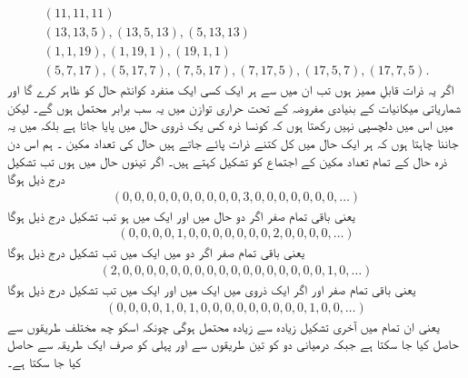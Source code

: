 \begin{align*}
	(11, 11, 11)\\
	(13, 13, 5), (13, 5, 13), (5, 13, 13)\\
	(1, 1, 19), (1, 19, 1), (19, 1, 1)\\
	(5, 7, 17), (5, 17, 7), (7, 5, 17), (7, 17, 5), (17, 5, 7), (17, 7, 5).
\end{align*}
اگر یہ ذرات قابلِ ممیز ہوں تب ان میں سے ہر ایک کسی ایک منفرد کوانٹم حال کو ظاہر کرے گا اور شماریاتی میکانیات کے بنیادی مفروضہ کے تحت حراری توازن میں یہ سب برابر محتمل ہوں گے۔ لیکن میں اس میں دلچسپی نہیں رکھتا ہوں کہ کونسا ذرہ کس یک ذروی حال میں پایا جاتا ہے بلکہ میں یہ جاننا چاہتا ہوں کہ ہر ایک حال میں کل کتنے ذرات پائے جاتے ہیں حال کی تعداد مکین ۔ ہم اس دن ذرہ حال کے تمام تعداد مکین کے اجتماع  کو تشکیل  کہتے ہیں۔ اگر تینوں حال   میں ہوں تب تشکیل  درج ذیل ہوگا
\begin{align}
	(0, 0, 0, 0, 0, 0, 0, 0, 0, 0, 3, 0, 0, 0, 0, 0, 0, 0, \dots)
\end{align} 
یعنی  باقی تمام صفر اگر دو حال  میں اور ایک  میں ہو تب تشکیل  درج ذیل ہوگا
\begin{align}
	(0, 0, 0, 0, 1, 0, 0, 0, 0, 0, 0, 0, 2, 0, 0, 0, 0, \dots)
\end{align}  
یعنی  باقی تمام صفر اگر دو  میں ایک  میں تب تشکیل  درج ذیل ہوگا
\begin{align}
	(2, 0, 0, 0, 0, 0, 0, 0, 0, 0, 0, 0, 0, 0, 0, 0, 0, 0, 1, 0, \dots)
\end{align} 
یعنی باقی تمام صفر اور اگر ایک ذروی  میں ایک  میں اور ایک  میں تب تشکیل  درج ذیل ہوگا 
\begin{align}
	(0, 0, 0, 0, 1, 0, 1, 0, 0, 0, 0, 0, 0, 0, 0, 0, 1, 0, 0, \dots)
\end{align} 
یعنی  ان تمام میں آخری تشکیل  زیادہ سے زیادہ محتمل ہوگی چونکہ اسکو چھ مختلف طریقوں سے حاصل کیا جا سکتا ہے جبکہ درمیانی دو کو تین طریقوں سے اور پہلی کو صرف ایک طریقہ سے حاصل کیا جا سکتا ہے۔

